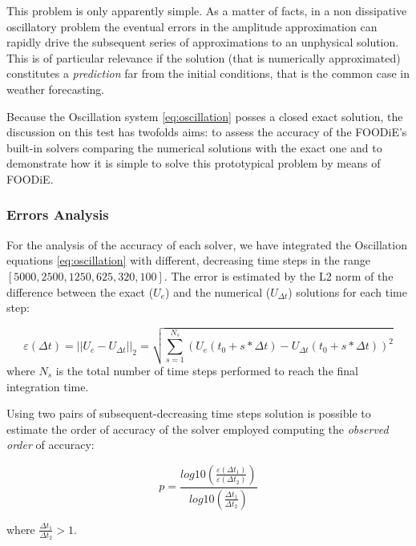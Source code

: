 This problem is only apparently simple. As a matter of facts, in a non dissipative oscillatory problem the eventual errors in the amplitude approximation can rapidly drive the subsequent series of approximations to an unphysical solution. This is of particular relevance if the solution (that is numerically approximated) constitutes a \emph{prediction} far from the initial conditions, that is the common case in weather forecasting.

Because the Oscillation system \ref{eq:oscillation} posses a closed exact solution, the discussion on this test has twofolds aims: to assess the accuracy of the FOODiE's built-in solvers comparing the numerical solutions with the exact one and to demonstrate how it is simple to solve this prototypical problem by means of FOODiE.

\subsubsection{Errors Analysis}

For the analysis of the accuracy of each solver, we have integrated the Oscillation equations \ref{eq:oscillation} with different, decreasing time steps in the range $[5000, 2500, 1250, 625, 320, 100]$. The error is estimated by the L2 norm of the difference between the exact ($U_e$) and the numerical ($U_{\Delta t}$) solutions for each time step:

\begin{equation}
  \varepsilon (\Delta t) = || U_e - U_{\Delta t} ||_2 = \sqrt{ \sum_{s=1}^{N_s} { \left(U_e(t_0 + s * \Delta t) - U_{\Delta t}(t_0 + s * \Delta t) \right)^2 }}
\label{eq:oscillation-error}
\end{equation}
where $N_s$ is the total number of time steps performed to reach the final integration time.

Using two pairs of subsequent-decreasing time steps solution is possible to estimate the order of accuracy of the solver employed computing the \emph{observed order} of accuracy:

\begin{equation}
  p = \frac{log10 \left( \frac{\varepsilon (\Delta t_1)}{\varepsilon (\Delta t_2)} \right)}{log10 \left( \frac{\Delta t_1}{\Delta t_2} \right)}
\label{eq:oscillation-observed-order}
\end{equation}

where $\frac{\Delta t_1}{\Delta t_2}>1$.














